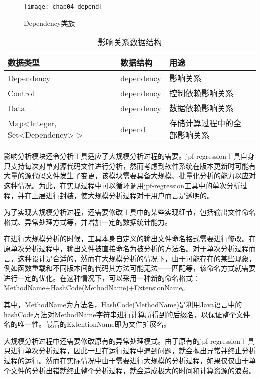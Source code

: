 \begin{figure}[H]
	\centering
	\texttt{[image: chap04\_depend]}
	\caption {Dependency类族}
	\label {class_depend}	
\end{figure}

\begin{table}[H]
	\caption{影响关系数据结构}
	\label{track_data}
	\centering
	\begin{tabular}{lllc}
		\toprule[1.5pt]
		{\heiti 数据类型} &{\heiti 数据结构} & {\heiti 用途} \\\midrule[1pt]
		Dependency & dependency & 影响关系 \\
		Control & dependency & 控制依赖影响关系 \\
		Data & dependency & 数据依赖影响关系 \\
		Map<Integer, Set<Dependency> > & depend & 存储计算过程中的全部影响关系\\
		\bottomrule[1.5pt]
	\end{tabular}
\end{table}


影响分析模块还令分析工具适应了大规模分析过程的需要。jpf-regression工具自身只支持每次对单对源代码文件进行分析，然而考虑到软件系统在版本更新时可能有大量的源代码文件发生了变更，该模块需要具备大规模、批量化分析的能力以应对这种情况。为此，在实现过程中可以循环调用jpf-regression工具中的单次分析过程，并在上层进行封装，使大规模分析过程对于用户而言是透明的。

为了实现大规模分析过程，还需要修改工具中的某些实现细节，包括输出文件命名格式、异常处理方式等，并增加一定的数据统计能力。

在进行大规模分析的时候，工具本身自定义的输出文件命名格式需要进行修改。在原单次分析过程中，输出文件被直接命名为被分析的方法名。对于单次分析过程而言，这种设计是合适的，然而在大规模分析的情况下，由于可能存在的某些现象，例如函数重载和不同版本间的代码其方法可能无法一一匹配等，该命名方式就需要进行一定的优化。在这种情况下，可以采用一种新的命名格式：MethodName+HashCode(MethodName)+ExtensionName。

其中，MethodName为方法名，HashCode(MethodName)是利用Java语言中的hashCode方法对MethodName字符串进行计算所得到的后缀名，以保证整个文件名的唯一性。最后的ExtentionName即为文件扩展名。

大规模分析过程中还需要修改原有的异常处理模式。由于原有的jpf-regression工具只进行单次分析过程，因此一旦在运行过程中遇到问题，就会抛出异常并终止分析过程的运行。然而在实际情况中由于需要进行大规模的分析过程，如果仅仅由于单个文件的分析出错就终止整个分析过程，就会造成极大的时间和计算资源的浪费。

